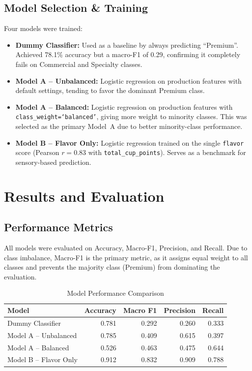 \documentclass[12pt, a4paper]{article}
\begin{document}
\subsection{Model Selection \& Training}

Four models were trained:

\begin{itemize}
  \item \textbf{Dummy Classifier:} Used as a baseline by always predicting ``Premium''. Achieved
        78.1\% accuracy but a macro-F1 of 0.29, confirming it completely fails on Commercial and
        Specialty classes.
  \item \textbf{Model A -- Unbalanced:} Logistic regression on production features with default
        settings, tending to favor the dominant Premium class.
  \item \textbf{Model A -- Balanced:} Logistic regression on production features with
        \texttt{class\_weight=`balanced'}, giving more weight to minority classes. This was
        selected as the primary Model~A due to better minority-class performance.
  \item \textbf{Model B -- Flavor Only:} Logistic regression trained on the single \texttt{flavor}
        score (Pearson $r = 0.83$ with \texttt{total\_cup\_points}). Serves as a benchmark for
        sensory-based prediction.
\end{itemize}

\section{Results and Evaluation}

\subsection{Performance Metrics}

All models were evaluated on Accuracy, Macro-F1, Precision, and Recall. Due to class imbalance,
Macro-F1 is the primary metric, as it assigns equal weight to all classes and prevents the majority
class (Premium) from dominating the evaluation.

\begin{table}[H]
  \centering
  \caption{Model Performance Comparison}
  \begin{tabular}{lrrrr}
    \toprule
    \textbf{Model} & \textbf{Accuracy} & \textbf{Macro F1} & \textbf{Precision} & \textbf{Recall} \\
    \midrule
    Dummy Classifier   & 0.781 & 0.292 & 0.260 & 0.333 \\
    Model A -- Unbalanced & 0.785 & 0.409 & 0.615 & 0.397 \\
    Model A -- Balanced   & 0.526 & 0.463 & 0.475 & 0.644 \\
    Model B -- Flavor Only& 0.912 & 0.832 & 0.909 & 0.788 \\
    \bottomrule
  \end{tabular}
\end{table}
\end{document}
